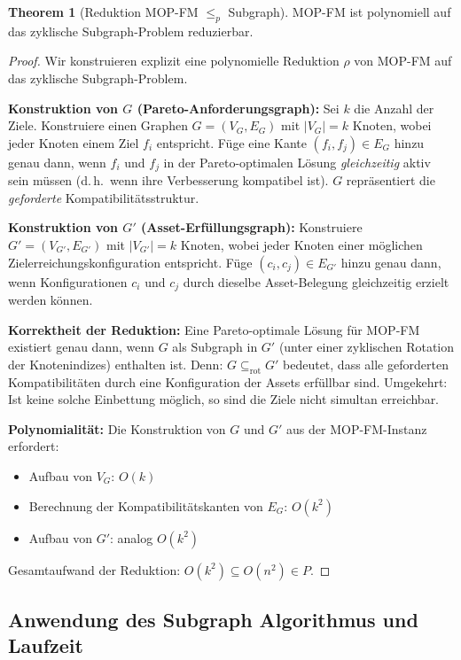 ﻿\documentclass[a4paper,12pt]{article}
\theoremstyle{definition}
\newtheorem{theorem}{Theorem}[section]
\begin{document}
\begin{theorem}[Reduktion MOP-FM $\leq_p$ Subgraph]
\label{thm:mop-red}
MOP-FM ist polynomiell auf das zyklische Subgraph-Problem reduzierbar.
\end{theorem}

\begin{proof}
Wir konstruieren explizit eine polynomielle Reduktion $\rho$ von MOP-FM auf
das zyklische Subgraph-Problem.

\textbf{Konstruktion von $G$ (Pareto-Anforderungsgraph):}
Sei $k$ die Anzahl der Ziele. Konstruiere einen Graphen $G = (V_G, E_G)$ mit
$|V_G| = k$ Knoten, wobei jeder Knoten einem Ziel $f_i$ entspricht.
Füge eine Kante $(f_i, f_j) \in E_G$ hinzu genau dann, wenn $f_i$ und $f_j$
in der Pareto-optimalen Lösung \emph{gleichzeitig} aktiv sein müssen
(d.\,h.\ wenn ihre Verbesserung kompatibel ist).
$G$ repräsentiert die \emph{geforderte} Kompatibilitätsstruktur.

\textbf{Konstruktion von $G'$ (Asset-Erfüllungsgraph):}
Konstruiere $G' = (V_{G'}, E_{G'})$ mit $|V_{G'}| = k$ Knoten,
wobei jeder Knoten einer möglichen Zielerreichungskonfiguration entspricht.
Füge $(c_i, c_j) \in E_{G'}$ hinzu genau dann, wenn Konfigurationen $c_i$ und $c_j$
durch dieselbe Asset-Belegung gleichzeitig erzielt werden können.

\textbf{Korrektheit der Reduktion:}
Eine Pareto-optimale Lösung für MOP-FM existiert genau dann, wenn $G$ als Subgraph
in $G'$ (unter einer zyklischen Rotation der Knotenindizes) enthalten ist.
Denn: $G \subseteq_{\mathrm{rot}} G'$ bedeutet, dass alle geforderten Kompatibilitäten
durch eine Konfiguration der Assets erfüllbar sind.
Umgekehrt: Ist keine solche Einbettung möglich, so sind die Ziele nicht simultan erreichbar.

\textbf{Polynomialität:}
Die Konstruktion von $G$ und $G'$ aus der MOP-FM-Instanz erfordert:
\begin{itemize}
    \item Aufbau von $V_G$: $O(k)$
    \item Berechnung der Kompatibilitätskanten von $E_G$: $O(k^2)$
    \item Aufbau von $G'$: analog $O(k^2)$
\end{itemize}
Gesamtaufwand der Reduktion: $O(k^2) \subseteq O(n^2) \in P$.
\end{proof}

\subsection{Anwendung des Subgraph Algorithmus und Laufzeit}
\end{document}
